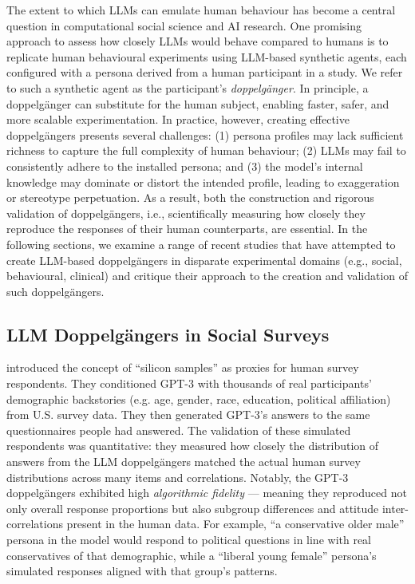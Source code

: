 The extent to which LLMs can emulate human behaviour has become a central question in
computational social science and AI research. One promising approach to assess how
closely LLMs would behave compared to humans is to replicate human behavioural
experiments using LLM-based synthetic agents, each configured with a persona derived
from a human participant in a study. We refer to such a synthetic agent as the
participant's \emph{doppelgänger}. In principle, a doppelgänger can substitute for the
human subject, enabling faster, safer, and more scalable experimentation. In practice,
however, creating effective doppelgängers presents several challenges: (1) persona
profiles may lack sufficient richness to capture the full complexity of human
behaviour; (2) LLMs may fail to consistently adhere to the installed persona; and (3)
the model's internal knowledge may dominate or distort the intended profile, leading to
exaggeration or stereotype perpetuation. As a result, both the construction and
rigorous validation of doppelgängers, i.e., scientifically measuring how closely they
reproduce the responses of their human counterparts, are essential. In the following
sections, we examine a range of recent studies that have attempted to create LLM-based
doppelgängers in disparate experimental domains (e.g., social, behavioural, clinical)
and critique their approach to the creation and validation of such doppelgängers.

\subsection*{LLM Doppelgängers in Social Surveys}
\citet{argyle2023} introduced the concept of ``silicon samples'' as proxies for human survey respondents. They conditioned GPT-3 with thousands of real participants' demographic backstories (e.g. age, gender, race, education, political affiliation) from U.S. survey data. They then generated GPT-3's answers to the same questionnaires people had answered. The validation of these simulated respondents was quantitative: they measured how closely the distribution of answers from the LLM doppelgängers matched the actual human survey distributions across many items and correlations. Notably, the GPT-3 doppelgängers exhibited high \textit{algorithmic fidelity} --- meaning they reproduced not only overall response proportions but also subgroup differences and attitude inter-correlations present in the human data. For example, ``a conservative older male'' persona in the model would respond to political questions in line with real conservatives of that demographic, while a ``liberal young female'' persona’s simulated responses aligned with that group’s patterns.

